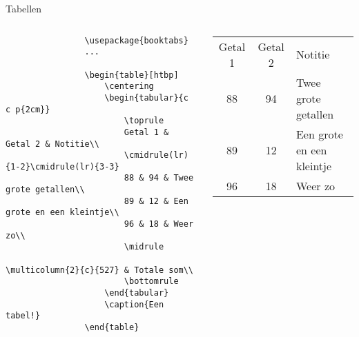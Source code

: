 \copyrightVincent

\begin{frame}[fragile]{Tabellen}
    \begin{columns}
        \begin{column}{0.5\textwidth}
            \begin{verbatim}
                \usepackage{booktabs}
                ...

                \begin{table}[htbp]
                    \centering
                    \begin{tabular}{c c p{2cm}}
                        \toprule
                        Getal 1 & Getal 2 & Notitie\\
                        \cmidrule(lr){1-2}\cmidrule(lr){3-3}
                        88 & 94 & Twee grote getallen\\
                        89 & 12 & Een grote en een kleintje\\
                        96 & 18 & Weer zo\\
                        \midrule
                        \multicolumn{2}{c}{527} & Totale som\\
                        \bottomrule
                    \end{tabular}
                    \caption{Een tabel!}
                \end{table}
            \end{verbatim}
        \end{column}
        \begin{column}{0.5\textwidth}
            \begin{adjustbox}{frame=1pt 10pt}%
                \begin{minipage}{\textwidth-22pt}
                    \begin{table}[H]
                        \centering
                        \begin{tabular}{c c p{2cm}}
                            \toprule
                            Getal 1 & Getal 2 & Notitie\\
                            \cmidrule(lr){1-2}\cmidrule(lr){3-3}
                            88 & 94 & Twee grote getallen\\
                            89 & 12 & Een grote en een kleintje\\
                            96 & 18 & Weer zo\\
                            \midrule

\end{tabular}
\end{table}
\end{minipage}
\end{adjustbox}
\end{column}
\end{columns}
\end{frame}
